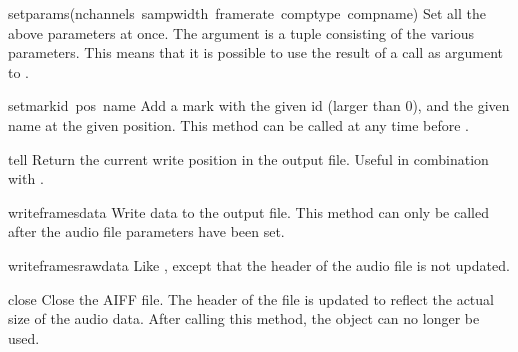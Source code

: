 \begin{funcdesc}{setparams}{(nchannels\, sampwidth\, framerate\, comptype\, compname)}
Set all the above parameters at once.  The argument is a tuple
consisting of the various parameters.  This means that it is possible
to use the result of a  call as argument to
.
\end{funcdesc}

\begin{funcdesc}{setmark}{id\, pos\, name}
Add a mark with the given id (larger than 0), and the given name at
the given position.  This method can be called at any time before
.
\end{funcdesc}

\begin{funcdesc}{tell}{}
Return the current write position in the output file.  Useful in
combination with .
\end{funcdesc}

\begin{funcdesc}{writeframes}{data}
Write data to the output file.  This method can only be called after
the audio file parameters have been set.
\end{funcdesc}

\begin{funcdesc}{writeframesraw}{data}
Like , except that the header of the audio file is
not updated.
\end{funcdesc}

\begin{funcdesc}{close}{}
Close the AIFF file.  The header of the file is updated to reflect the
actual size of the audio data. After calling this method, the object
can no longer be used.
\end{funcdesc}
